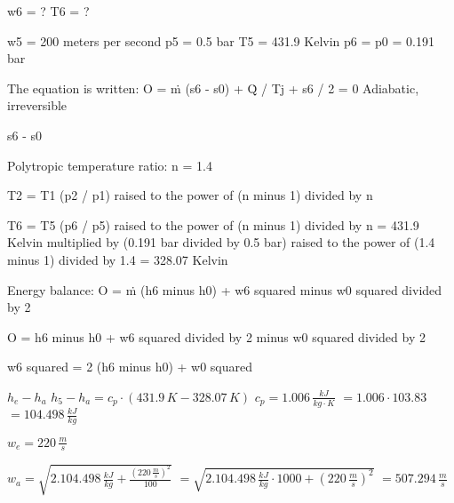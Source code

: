 w6 = ?  
T6 = ?  

w5 = 200 meters per second  
p5 = 0.5 bar  
T5 = 431.9 Kelvin  
p6 = p0 = 0.191 bar  

The equation is written:  
O = ṁ (s6 - s0) + Q̇ / Tj + s6 / 2 = 0  
Adiabatic, irreversible  

s6 - s0  

Polytropic temperature ratio: n = 1.4  

T2 = T1 (p2 / p1) raised to the power of (n minus 1) divided by n  

T6 = T5 (p6 / p5) raised to the power of (n minus 1) divided by n = 431.9 Kelvin multiplied by (0.191 bar divided by 0.5 bar) raised to the power of (1.4 minus 1) divided by 1.4 = 328.07 Kelvin  

Energy balance:  
O = ṁ (h6 minus h0) + w6 squared minus w0 squared divided by 2  

O = h6 minus h0 + w6 squared divided by 2 minus w0 squared divided by 2  

w6 squared = 2 (h6 minus h0) + w0 squared

\( h_e - h_a \)  
\( h_5 - h_a = c_p \cdot (431.9 \, K - 328.07 \, K) \)  
\( c_p = 1.006 \, \frac{kJ}{kg \cdot K} \)  
\( = 1.006 \cdot 103.83 \)  
\( = 104.498 \, \frac{kJ}{kg} \)  

\( w_e = 220 \, \frac{m}{s} \)  

\( w_a = \sqrt{2.104.498 \, \frac{kJ}{kg} + \frac{(220 \, \frac{m}{s})^2}{100}} \)  
\( = \sqrt{2.104.498 \, \frac{kJ}{kg} \cdot 1000 + (220 \, \frac{m}{s})^2} \)  
\( = 507.294 \, \frac{m}{s} \)
